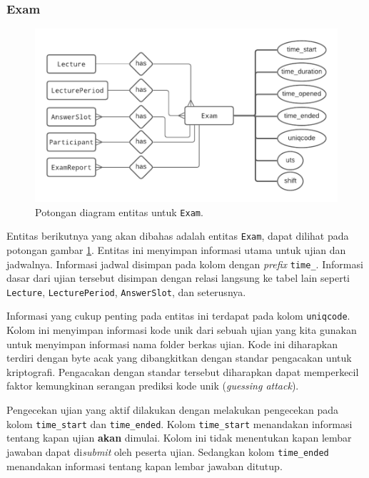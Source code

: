 \subsubsection{Exam}
    \begin{figure}
        \centering
        \includegraphics[width=0.75\paperwidth]{Gambar/erd-details/ERD--New - Exam.pdf}
        \caption{Potongan diagram entitas untuk \texttt{Exam}.}
        \label{fig:erd_exam}
    \end{figure}
    Entitas berikutnya yang akan dibahas adalah entitas \texttt{Exam}, dapat dilihat pada potongan
    gambar \ref{fig:erd_exam}. Entitas ini menyimpan informasi utama untuk ujian dan jadwalnya.
    Informasi jadwal disimpan pada kolom dengan \textit{prefix} \texttt{time\_}. Informasi dasar
    dari ujian tersebut disimpan dengan relasi langsung ke tabel lain seperti \texttt{Lecture},
    \texttt{LecturePeriod}, \texttt{AnswerSlot}, dan seterusnya. 
    
    Informasi yang cukup penting pada entitas ini terdapat pada kolom \texttt{uniqcode}. Kolom
    ini menyimpan informasi kode unik dari sebuah ujian yang kita gunakan untuk menyimpan informasi
    nama folder berkas ujian. Kode ini diharapkan terdiri dengan byte acak yang dibangkitkan dengan
    standar pengacakan untuk kriptografi. Pengacakan dengan standar tersebut diharapkan dapat
    memperkecil faktor kemungkinan serangan prediksi kode unik (\textit{guessing attack}).
    
    Pengecekan ujian yang aktif dilakukan dengan melakukan pengecekan pada kolom 
    \texttt{time\_start} dan \texttt{time\_ended}. Kolom \texttt{time\_start} menandakan
    informasi tentang kapan ujian \textbf{akan} dimulai. Kolom ini tidak menentukan kapan
    lembar jawaban dapat di\textit{submit} oleh peserta ujian. Sedangkan kolom \texttt{time\_ended}
    menandakan informasi tentang kapan lembar jawaban ditutup.
    

